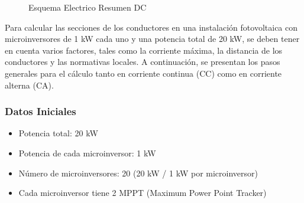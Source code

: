 \documentclass[a4paper,12pt]{article}
\begin{document}
\begin{Form}
\begin{figure}[h]
      \caption{Esquema Electrico Resumen DC}
  \end{figure}









Para calcular las secciones de los conductores en una instalación fotovoltaica con microinversores de 1 kW cada uno y una potencia total de 20 kW, se deben tener en cuenta varios factores, tales como la corriente máxima, la distancia de los conductores y las normativas locales. A continuación, se presentan los pasos generales para el cálculo tanto en corriente continua (CC) como en corriente alterna (CA).

\subsubsection{Datos Iniciales}
\begin{itemize}
    \item Potencia total: 20 kW
    \item Potencia de cada microinversor: 1 kW
    \item Número de microinversores: 20 (20 kW / 1 kW por microinversor)
    \item Cada microinversor tiene 2 MPPT (Maximum Power Point Tracker)
\end{itemize}


\end{Form}
\end{document}
